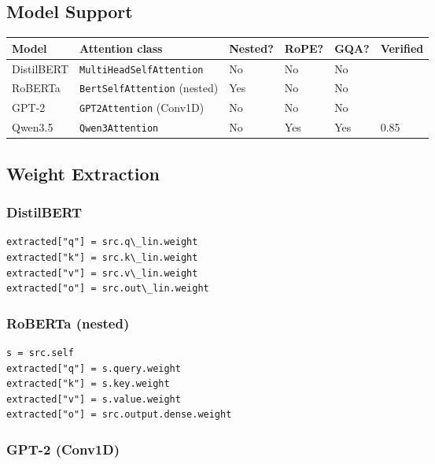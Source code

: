 \subsection{Model Support}

\begin{table}[H]
\centering
\small
\begin{tabular}{llllll}
\toprule
\textbf{Model} & \textbf{Attention class} & \textbf{Nested?} & \textbf{RoPE?} & \textbf{GQA?} & \textbf{Verified} \\
\midrule
DistilBERT & \texttt{MultiHeadSelfAttention} & No & No & No &  \\
RoBERTa & \texttt{BertSelfAttention} (nested) & Yes & No & No &  \\
GPT-2 & \texttt{GPT2Attention} (Conv1D) & No & No & No &  \\
Qwen3.5 & \texttt{Qwen3Attention} & No & Yes & Yes & 0.85 \\
\bottomrule
\end{tabular}
\end{table}

\subsection{Weight Extraction}

\subsubsection{DistilBERT}

\begin{lstlisting}
extracted["q"] = src.q\_lin.weight
extracted["k"] = src.k\_lin.weight
extracted["v"] = src.v\_lin.weight
extracted["o"] = src.out\_lin.weight
\end{lstlisting}

\subsubsection{RoBERTa (nested)}

\begin{lstlisting}
s = src.self
extracted["q"] = s.query.weight
extracted["k"] = s.key.weight
extracted["v"] = s.value.weight
extracted["o"] = src.output.dense.weight
\end{lstlisting}

\subsubsection{GPT-2 (Conv1D)}

